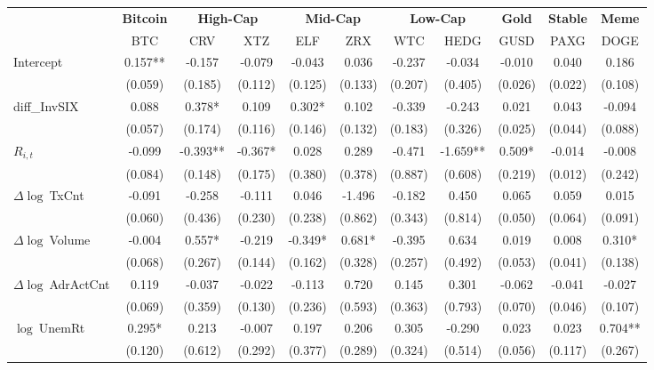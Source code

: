 \begin{table}[ht]
\centering
\scriptsize
\setlength{\tabcolsep}{4pt}
\begin{tabular}{l *{10}{c}}
\toprule
&\multicolumn{1}{c}{\textbf{Bitcoin}}&\multicolumn{2}{c}{\textbf{High-Cap}}&\multicolumn{2}{c}{\textbf{Mid-Cap}}&\multicolumn{2}{c}{\textbf{Low-Cap}}&\multicolumn{1}{c}{\textbf{Gold}}&\multicolumn{1}{c}{\textbf{Stable}}&\multicolumn{1}{c}{\textbf{Meme}}\\
\addlinespace
 & BTC & CRV & XTZ & ELF & ZRX & WTC & HEDG & GUSD & PAXG & DOGE \\
\midrule
Intercept & 0.157** & -0.157 & -0.079 & -0.043 & 0.036 & -0.237 & -0.034 & -0.010 & 0.040 & 0.186 \\
 & (0.059) & (0.185) & (0.112) & (0.125) & (0.133) & (0.207) & (0.405) & (0.026) & (0.022) & (0.108) \\
\addlinespace
diff_InvSIX & 0.088 & 0.378* & 0.109 & 0.302* & 0.102 & -0.339 & -0.243 & 0.021 & 0.043 & -0.094 \\
 & (0.057) & (0.174) & (0.116) & (0.146) & (0.132) & (0.183) & (0.326) & (0.025) & (0.044) & (0.088) \\
\addlinespace
$R_{i,t}$ & -0.099 & -0.393** & -0.367* & 0.028 & 0.289 & -0.471 & -1.659** & 0.509* & -0.014 & -0.008 \\
 & (0.084) & (0.148) & (0.175) & (0.380) & (0.378) & (0.887) & (0.608) & (0.219) & (0.012) & (0.242) \\
\addlinespace
$\Delta\log\ $TxCnt & -0.091 & -0.258 & -0.111 & 0.046 & -1.496 & -0.182 & 0.450 & 0.065 & 0.059 & 0.015 \\
 & (0.060) & (0.436) & (0.230) & (0.238) & (0.862) & (0.343) & (0.814) & (0.050) & (0.064) & (0.091) \\
\addlinespace
$\Delta\log\ $Volume & -0.004 & 0.557* & -0.219 & -0.349* & 0.681* & -0.395 & 0.634 & 0.019 & 0.008 & 0.310* \\
 & (0.068) & (0.267) & (0.144) & (0.162) & (0.328) & (0.257) & (0.492) & (0.053) & (0.041) & (0.138) \\
\addlinespace
$\Delta\log\ $AdrActCnt & 0.119 & -0.037 & -0.022 & -0.113 & 0.720 & 0.145 & 0.301 & -0.062 & -0.041 & -0.027 \\
 & (0.069) & (0.359) & (0.130) & (0.236) & (0.593) & (0.363) & (0.793) & (0.070) & (0.046) & (0.107) \\
\addlinespace
$\log\ $UnemRt & 0.295* & 0.213 & -0.007 & 0.197 & 0.206 & 0.305 & -0.290 & 0.023 & 0.023 & 0.704** \\
 & (0.120) & (0.612) & (0.292) & (0.377) & (0.289) & (0.324) & (0.514) & (0.056) & (0.117) & (0.267) \\

\end{tabular}
\end{table}
